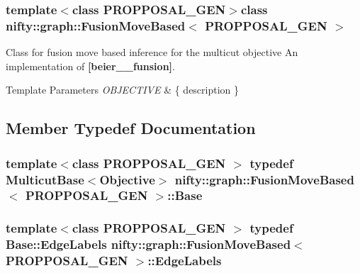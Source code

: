 \subsubsection*{template$<$class P\+R\+O\+P\+P\+O\+S\+A\+L\+\_\+\+G\+E\+N$>$class nifty\+::graph\+::\+Fusion\+Move\+Based$<$ P\+R\+O\+P\+P\+O\+S\+A\+L\+\_\+\+G\+E\+N $>$}

Class for fusion move based inference for the multicut objective An implementation of {\bfseries [beier\+\_\+\_\+funsion]}. 


\begin{DoxyTemplParams}{Template Parameters}
{\em O\+B\+J\+E\+C\+T\+I\+V\+E} & \{ description \} \\
\hline
\end{DoxyTemplParams}


\subsection{Member Typedef Documentation}
\hypertarget{classnifty_1_1graph_1_1FusionMoveBased_ad0739c1f6bb9f1b4061ba683b06707b0}{}
\subsubsection[{Base}]{\setlength{\rightskip}{0pt plus 5cm}template$<$class P\+R\+O\+P\+P\+O\+S\+A\+L\+\_\+\+G\+E\+N $>$ typedef {\bf Multicut\+Base}$<${\bf Objective}$>$ {\bf nifty\+::graph\+::\+Fusion\+Move\+Based}$<$ P\+R\+O\+P\+P\+O\+S\+A\+L\+\_\+\+G\+E\+N $>$\+::{\bf Base}}\label{classnifty_1_1graph_1_1FusionMoveBased_ad0739c1f6bb9f1b4061ba683b06707b0}
\hypertarget{classnifty_1_1graph_1_1FusionMoveBased_a06b3870b5ac32bfd6cd197347f0563b7}{}
\subsubsection[{Edge\+Labels}]{\setlength{\rightskip}{0pt plus 5cm}template$<$class P\+R\+O\+P\+P\+O\+S\+A\+L\+\_\+\+G\+E\+N $>$ typedef {\bf Base\+::\+Edge\+Labels} {\bf nifty\+::graph\+::\+Fusion\+Move\+Based}$<$ P\+R\+O\+P\+P\+O\+S\+A\+L\+\_\+\+G\+E\+N $>$\+::{\bf Edge\+Labels}}\label{classnifty_1_1graph_1_1FusionMoveBased_a06b3870b5ac32bfd6cd197347f0563b7}
\hypertarget{classnifty_1_1graph_1_1FusionMoveBased_a650e7beea4f78efe543928dd00c1f713}{}
